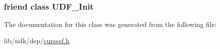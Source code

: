 \hypertarget{class_user_defined_field_type___with___choice_a6921f179e94abfa35acfec3576f948a4}{
\subsubsection[{U\-D\-F\-\_\-\-Init}]{\setlength{\rightskip}{0pt plus 5cm}friend class U\-D\-F\-\_\-\-Init\hspace{0.3cm}{\ttfamily [friend]}}}\label{class_user_defined_field_type___with___choice_a6921f179e94abfa35acfec3576f948a4}


The documentation for this class was generated from the following file\-:\begin{DoxyCompactItemize}
\item 
lib/ndk/dep/\hyperlink{cursesf_8h}{cursesf.\-h}\end{DoxyCompactItemize}
